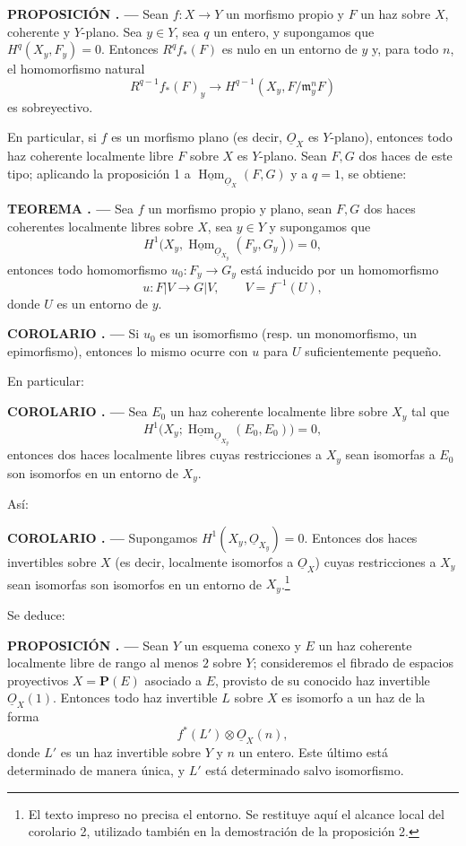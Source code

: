 \documentclass[11pt,twoside,openany]{book}
\numberwithin{equation}{section}
\newcommand{\src}[1]{%
  \phantomsection\hypertarget{src:#1}{}%
  \marginpar{\raggedleft\footnotesize\sffamily #1}%
}
\newcommand{\Osh}{\underline{O}}
\newcommand{\Homsh}{\underline{\operatorname{Hom}}}
\theoremstyle{plain}
\theoremstyle{definition}
\theoremstyle{remark}
\newcommand{\result}[2]{%
  \par\medskip\noindent\textbf{#1%
  \if\relax\detokenize{#2}\relax\else\space#2\fi. ---}\enspace
}
\newcommand{\FgaUnitKey}{frontmatter}
\renewcommand{\src}[1]{%
  \phantomsection\hypertarget{src:\FgaUnitKey:#1}{}%
  \marginpar{\raggedleft\footnotesize\sffamily #1}%
}
\theoremstyle{plain}
\theoremstyle{definition}
\theoremstyle{remark}
\begin{document}
\src{201}
\result{PROPOSICIÓN}{1} Sean $f:X\longrightarrow Y$ un morfismo propio y $F$
un haz sobre $X$, coherente y $Y$-plano. Sea $y\in Y$, sea $q$ un entero, y
supongamos que $H^q(X_y,F_y)=0$. Entonces $R^qf_*(F)$ es nulo en un entorno de
$y$ y, para todo $n$, el homomorfismo natural
\[
  R^{q-1}f_*(F)_y\longrightarrow
  H^{q-1}(X_y,F/\mathfrak m_y^nF)
\]
es sobreyectivo.

En particular, si $f$ es un morfismo plano (es decir, $\Osh_X$ es $Y$-plano),
entonces todo haz coherente localmente libre $F$ sobre $X$ es $Y$-plano. Sean
$F,G$ dos haces de este tipo; aplicando la proposición 1 a
$\Homsh_{\Osh_X}(F,G)$ y a $q=1$, se obtiene:

\result{TEOREMA}{7} Sea $f$ un morfismo propio y plano, sean $F,G$ dos haces
coherentes localmente libres sobre $X$, sea $y\in Y$ y supongamos que
\[
  H^1\bigl(X_y,\Homsh_{\Osh_{X_y}}(F_y,G_y)\bigr)=0,
\]
entonces todo homomorfismo $u_0:F_y\longrightarrow G_y$ está inducido por un
homomorfismo
\[
  u:F|V\longrightarrow G|V,
  \qquad V=f^{-1}(U),
\]
donde $U$ es un entorno de $y$.

\result{COROLARIO}{} Si $u_0$ es un isomorfismo (resp. un monomorfismo, un
epimorfismo), entonces lo mismo ocurre con $u$ para $U$ suficientemente
pequeño.

En particular:

\src{202}
\result{COROLARIO}{2} Sea $E_0$ un haz coherente localmente libre sobre $X_y$
tal que
\[
  H^1\bigl(X_y;\Homsh_{\Osh_{X_y}}(E_0,E_0)\bigr)=0,
\]
entonces dos haces localmente libres cuyas restricciones a $X_y$ sean isomorfas
a $E_0$ son isomorfos en un entorno de $X_y$.

Así:

\result{COROLARIO}{3} Supongamos $H^1(X_y,\Osh_{X_y})=0$. Entonces dos haces
invertibles sobre $X$ (es decir, localmente isomorfos a $\Osh_X$) cuyas
restricciones a $X_y$ sean isomorfas son isomorfos en un entorno de $X_y$.\footnote{El texto impreso no precisa el entorno. Se restituye aquí el alcance local del corolario 2, utilizado también en la demostración de la proposición 2.}

Se deduce:

\result{PROPOSICIÓN}{2} Sean $Y$ un esquema conexo y $E$ un haz coherente localmente libre de rango al menos $2$ sobre $Y$; consideremos el fibrado de espacios proyectivos
$X=\mathbf P(E)$ asociado a $E$, provisto de su conocido haz invertible
$\Osh_X(1)$. Entonces todo haz invertible $L$ sobre $X$ es isomorfo a un haz de
la forma
\[
  f^*(L')\otimes\Osh_X(n),
\]
donde $L'$ es un haz invertible sobre $Y$ y $n$ un entero. Este último está
determinado de manera única, y $L'$ está determinado salvo isomorfismo.
\end{document}
